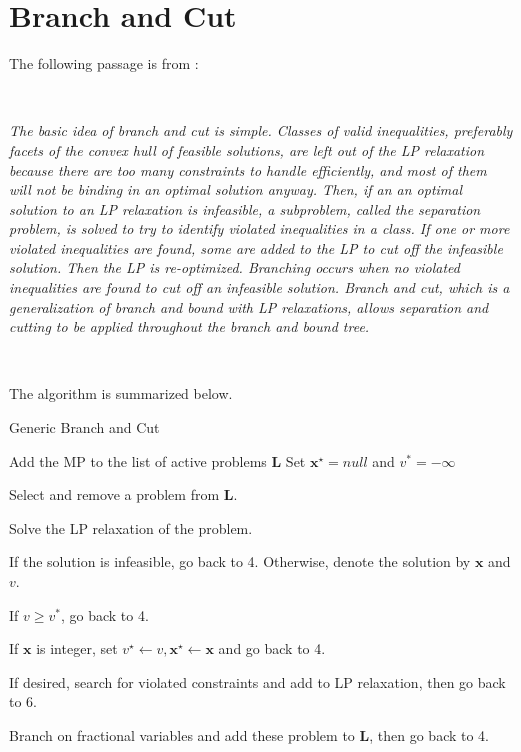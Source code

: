 \documentclass{article}
\begin{document}
\newpage
\section{Branch and Cut}

The following passage is from \cite{barnhart1998branch}:

\

\textit{The basic idea of branch and cut is simple. Classes of valid inequalities, preferably facets of the convex hull of feasible solutions, are left out of the LP relaxation because there are too many constraints to handle efficiently, and most of them will not be binding in an optimal solution anyway. Then, if an an optimal solution to an LP relaxation is infeasible, a subproblem, called the separation problem, is solved to try to identify violated inequalities in a class. If one or more violated inequalities are found, some are added to the LP to cut off the infeasible solution. Then the LP is re-optimized. Branching occurs when no violated inequalities are found to cut off an infeasible solution. Branch and cut, which is a generalization of branch and bound with LP relaxations, allows separation and cutting to be applied throughout the branch and bound tree.}

\

The algorithm is summarized below.

\begin{algorithm}[htbp]
	\caption{Generic Branch and Cut}
	\begin{algorithmic}[1]
		\State Add the MP to the list of active problems \textbf{L}
		\State Set $\bm{x}^\star = null $ and $v^* = -\infty$
		
		\State Select and remove a problem from \textbf{L}.
		
		\State Solve the LP relaxation of the problem.
		
		\State If the solution is infeasible, go back to 4. Otherwise, denote the solution by $\bm{x}$ and $v$.
		
		\State If $v\geq v^*$, go back to 4.
		
		\State If $\bm{x}$ is integer, set $v^\star \leftarrow v, \bm{x}^\star \leftarrow \bm{x}$ and go back to 4.
		
		\State If desired, search for violated constraints and add to LP relaxation, then go back to 6.
		
		\State Branch on fractional variables and add these problem to \textbf{L}, then go back to 4.
		
		\EndWhile
	\end{algorithmic}
	\label{alg:bc}
\end{algorithm}
\end{document}
